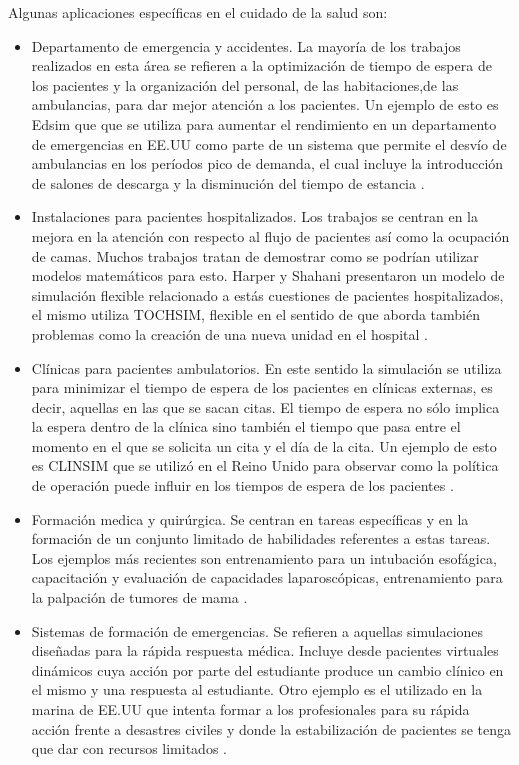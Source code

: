 Algunas aplicaciones específicas en el cuidado de la salud son:

\begin{itemize}
\item Departamento de emergencia y accidentes. La mayoría de los trabajos realizados en esta área se refieren a la optimización de tiempo de espera de los pacientes y la organización del personal, de las habitaciones,de las ambulancias, para dar mejor atención a los pacientes. Un ejemplo de esto es Edsim que que se utiliza para aumentar el rendimiento en un departamento de emergencias en EE.UU como parte de un sistema que permite el desvío de ambulancias en los períodos pico de demanda, el cual incluye la introducción de salones de descarga y la disminución del tiempo de estancia \cite{guna:simulation}. 
\item Instalaciones para pacientes hospitalizados. Los trabajos se centran en la  mejora en la atención con respecto al flujo de pacientes así como la ocupación de camas. Muchos trabajos tratan de demostrar como se podrían utilizar modelos matemáticos para esto. Harper y Shahani presentaron un modelo de simulación flexible relacionado a estás cuestiones de pacientes hospitalizados, el mismo utiliza TOCHSIM, flexible en el sentido de que aborda también problemas como la creación de una nueva unidad en el hospital \cite{guna:simulation}.
\item Clínicas para pacientes ambulatorios. En este sentido la simulación se utiliza para minimizar el tiempo de espera de los pacientes en clínicas externas, es decir, aquellas en las que se sacan citas. El tiempo de espera no sólo implica la espera dentro de la clínica sino también el tiempo que pasa entre el momento en el que se solicita un cita y el día de la cita. Un ejemplo de esto es CLINSIM que se utilizó en el Reino Unido para observar como la política de operación puede influir en los tiempos de espera de los pacientes \cite{guna:simulation}.
\item Formación medica y quirúrgica. Se centran en tareas específicas y en la formación de un conjunto limitado de habilidades referentes a estas tareas. Los ejemplos más recientes son entrenamiento para un intubación esofágica, capacitación y evaluación de capacidades laparoscópicas, entrenamiento para la palpación de tumores de mama \cite{mantovani:vr}.
\item Sistemas de formación de emergencias. Se refieren a aquellas simulaciones diseñadas para la rápida respuesta médica. Incluye desde pacientes  virtuales dinámicos cuya acción por parte del estudiante produce un cambio clínico en el mismo y una respuesta al estudiante.  Otro ejemplo es el utilizado en la marina de EE.UU que intenta formar a los profesionales para su rápida acción frente a desastres civiles y donde la estabilización de pacientes se tenga que dar con recursos limitados \cite{mantovani:vr}.

\end{itemize}
